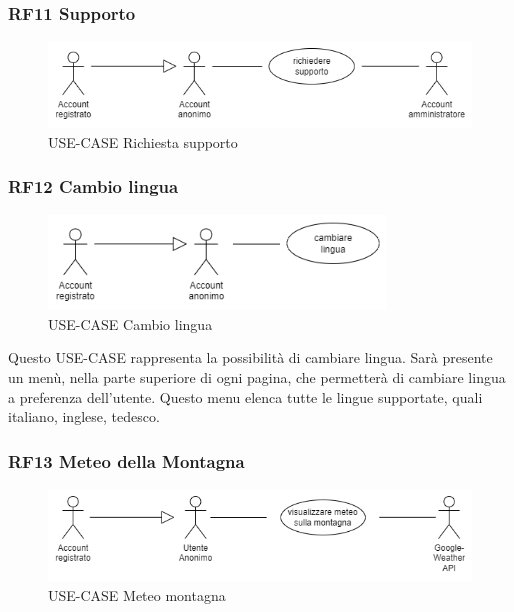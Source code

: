\documentclass[a4paper,12pt]{article}
\begin{document}
\subsubsection*{RF11 Supporto}
\begin{figure}[H]
   \centering
   \includegraphics[width=1\textwidth]{img/richiesta_supporto.png}
    \caption{USE-CASE Richiesta supporto}
\end{figure}

\subsubsection*{RF12 Cambio lingua}
\begin{figure}[H]
   \centering
   \includegraphics[width=0.8\textwidth]{img/cambio_lingua.png}
    \caption{USE-CASE Cambio lingua}
\end{figure}

Questo USE-CASE rappresenta la possibilità di cambiare lingua.
Sarà presente un menù, nella parte superiore di ogni pagina, che permetterà di cambiare lingua a preferenza dell'utente. 
Questo menu elenca tutte le lingue supportate, quali italiano, inglese, tedesco.

\subsubsection*{RF13 Meteo della Montagna}
\begin{figure}[H]
   \centering
   \includegraphics[width=1\textwidth]{img/meteo.png}
    \caption{USE-CASE Meteo montagna}
\end{figure}
\end{document}
